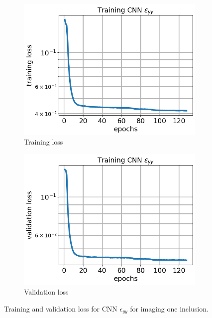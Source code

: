 \documentclass[12pt]{article}
\newcommand{\nhgfigheight}{4.0cm}
\begin{document}
\begin{figure}[h]
  \centering
  \begin{subfigure}[b]{0.45\linewidth}
    \includegraphics[totalheight=\nhgfigheight]{Figures/final1/training/eyy/field_strainyy_plot_loss.png}
    \caption{Training loss}
  \end{subfigure}
  \begin{subfigure}[b]{0.45\linewidth}
    \includegraphics[totalheight=\nhgfigheight]{Figures/final1/training/eyy/field_strainyy_plot_val_loss.png}
    \caption{Validation loss}
  \end{subfigure}
\caption{\label{fig:oneinc:traineyy} Training and validation loss for CNN $\epsilon_{yy}$ for imaging one inclusion.}
\end{figure} 
\end{document}
